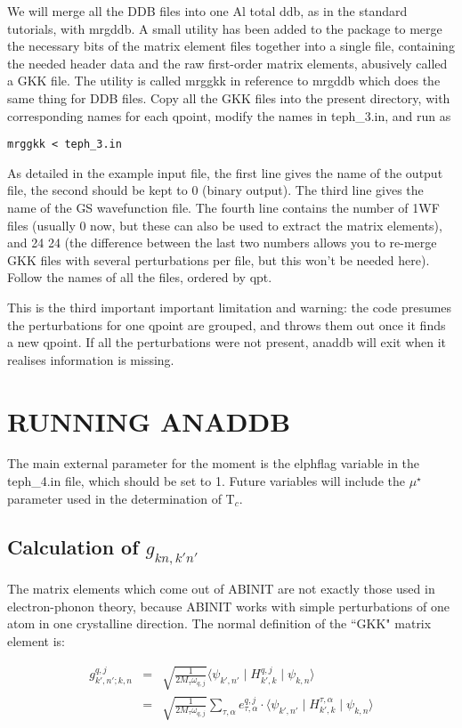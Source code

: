 \documentclass[aps,preprint]{revtex4-1}
\begin{document}
We will merge all the DDB files into one Al total ddb, as in the
standard tutorials, with mrgddb.
A small utility has been added to the package to merge the necessary bits of
the matrix element files together into a single file, containing the needed
header data and the raw first-order matrix elements, abusively called a GKK
file. The utility is called mrggkk in reference to mrgddb which does the same
thing for DDB files. Copy all the GKK files into the present directory, with
corresponding names for each qpoint, modify the names in teph\_3.in, and run as
\begin{verbatim}
mrggkk < teph_3.in
\end{verbatim}

As detailed in the example input file, the first line gives the name of the
output file, the second should be kept to 0 (binary output). The third
line gives the name of the GS wavefunction file. The fourth line contains the
number of 1WF files (usually 0 now, but these can also be used to extract the matrix elements),
and 24 24 (the difference between the last two numbers allows you to re-merge GKK
files with several perturbations per file, but this won't be needed here). 
Follow the names of all the files, ordered by qpt.

This is the third important important limitation and warning: the code
presumes the perturbations for one qpoint are grouped, and throws them out
once it finds a new qpoint. If all the perturbations were not present, anaddb
will exit when it realises information is missing.

\section{RUNNING ANADDB}

The main external parameter for the moment is the elphflag variable in the
teph\_4.in file, which should be set to 1. Future variables will include the
$\mu^{\star}$ parameter used in the determination of T$_c$.

\subsection{Calculation of $g_{kn,k'n'}$}
The matrix elements which come out of ABINIT are not exactly those used in
electron-phonon theory, because ABINIT works with simple perturbations of one
atom in one crystalline direction. The normal definition of the ``GKK" matrix
element is:

\begin{eqnarray}
g^{q,j}_{k',n';k,n} &=& \sqrt{\frac{1}{2 M_\tau \omega_{q,j}}} \langle \psi_{k',n'} \mid H^{q,j}_{k',k} \mid \psi_{k,n}\rangle \\
&=& \sqrt{\frac{1}{2 M_\tau \omega_{q,j}}} \sum_{\tau, \alpha} {e}^{q,j}_{\tau, \alpha} \cdot \langle \psi_{k',n'} \mid H^{\tau, \alpha}_{k',k} \mid \psi_{k,n}\rangle
\end{eqnarray}
\end{document}
